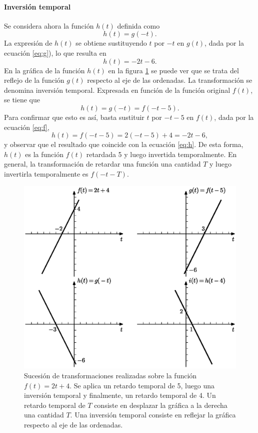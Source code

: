 \documentclass[a4paper]{article}
\begin{document}
\paragraph{Inversión temporal} Se considera ahora la función \(h(t)\) definida como
\[
 h(t)=g(-t).
\]
La expresión de \(h(t)\) se obtiene sustituyendo \(t\) por \(-t\) en \(g(t)\), dada por la ecuación \ref{eq:g}), lo que resulta en
\begin{equation}\label{eq:h}
 h(t)=-2t-6.
\end{equation}
En la gráfica de la función \(h(t)\) en la figura \ref{fig:function_transformations} se puede ver que se trata del reflejo de la función \(g(t)\) respecto al eje de las ordenadas. La transformación se denomina inversión temporal. Expresada en función de la función original \(f(t)\), se tiene que
\[
 h(t)=g(-t)=f(-t-5).
\]
Para confirmar que esto es así, basta sustituir \(t\) por \(-t-5\) en \(f(t)\), dada por la ecuación \ref{eq:f},
\[
 h(t)=f(-t-5)=2(-t-5)+4=-2t-6,
\]
y observar que el resultado que coincide con la ecuación \ref{eq:h}. De esta forma, \(h(t)\) es la función \(f(t)\) retardada 5 y luego invertida temporalmente. En general, la transformación de retardar una función una cantidad \(T\) y luego invertirla temporalmente es \(f(-t-T)\).

\begin{figure}[!htb]
\begin{center}
\includegraphics[width=0.9\columnwidth]{figuras/function_transformations.eps}
\caption{\label{fig:function_transformations} Sucesión de transformaciones realizadas sobre la función \(f(t)=2t+4\). Se aplica un retardo temporal de 5, luego una inversión temporal y finalmente, un retardo temporal de 4. Un retardo temporal de \(T\) consiste en desplazar la gráfica a la derecha una cantidad \(T\). Una inversión temporal consiste en reflejar la gráfica respecto al eje de las ordenadas.}
\end{center}
\end{figure}
\end{document}
